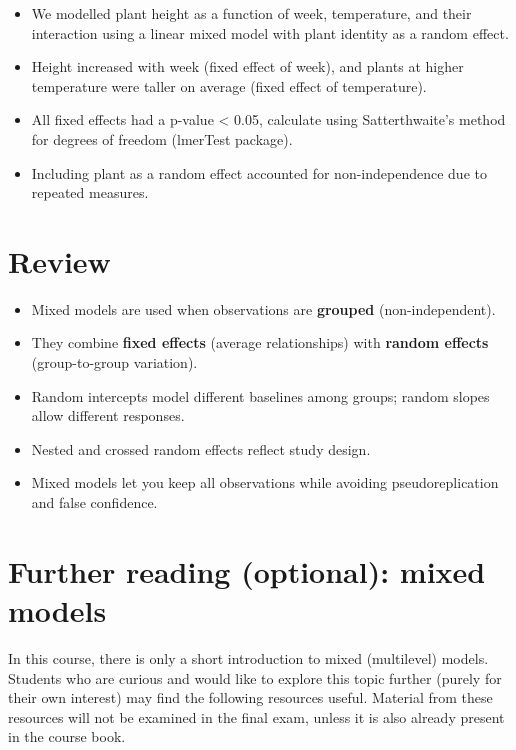 \documentclass[
  letterpaper,
  8pt,
  a4paper]{book}
\providecommand{\tightlist}{%
  \setlength{\itemsep}{0pt}\setlength{\parskip}{0pt}}
\begin{document}
\begin{itemize}
\tightlist
\item
  We modelled plant height as a function of week, temperature, and their
  interaction using a linear mixed model with plant identity as a random
  effect.\\
\item
  Height increased with week (fixed effect of week), and plants at
  higher temperature were taller on average (fixed effect of
  temperature).
\item
  All fixed effects had a p-value \textless{} 0.05, calculate using
  Satterthwaite's method for degrees of freedom (lmerTest package).
\item
  Including plant as a random effect accounted for non-independence due
  to repeated measures.
\end{itemize}

\section*{Review}\label{review-9}


\begin{itemize}
\tightlist
\item
  Mixed models are used when observations are \textbf{grouped}
  (non-independent).
\item
  They combine \textbf{fixed effects} (average relationships) with
  \textbf{random effects} (group-to-group variation).
\item
  Random intercepts model different baselines among groups; random
  slopes allow different responses.
\item
  Nested and crossed random effects reflect study design.
\item
  Mixed models let you keep all observations while avoiding
  pseudoreplication and false confidence.
\end{itemize}

\section*{Further reading (optional): mixed
models}\label{further-reading-optional-mixed-models}


In this course, there is only a short introduction to mixed (multilevel)
models. Students who are curious and would like to explore this topic
further (purely for their own interest) may find the following resources
useful. Material from these resources will not be examined in the final
exam, unless it is also already present in the course book.
\end{document}
